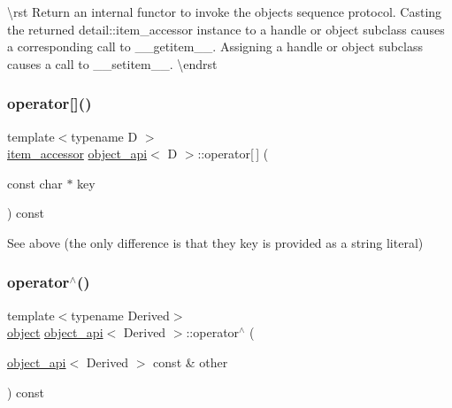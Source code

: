 \textbackslash{}rst Return an internal functor to invoke the object\textquotesingle{}s sequence protocol. Casting the returned {\ttfamily detail\+::item\+\_\+accessor} instance to a {\ttfamily handle} or {\ttfamily object} subclass causes a corresponding call to {\ttfamily \+\_\+\+\_\+getitem\+\_\+\+\_\+}. Assigning a {\ttfamily handle} or {\ttfamily object} subclass causes a call to {\ttfamily \+\_\+\+\_\+setitem\+\_\+\+\_\+}. \textbackslash{}endrst \mbox{\label{classobject__api_a81277a47b87a2a79f216895d7a5018a8}} 
\subsubsection{\texorpdfstring{operator[]()}{operator[]()}\hspace{0.1cm}{\footnotesize\ttfamily [2/2]}}
{\footnotesize\ttfamily template$<$typename D $>$ \\
\mbox{\hyperlink{pytypes_8h_a9907d3edf962653e33d36bccc8b8a268}{item\+\_\+accessor}} \mbox{\hyperlink{classobject__api}{object\+\_\+api}}$<$ D $>$\+::operator\mbox{[}$\,$\mbox{]} (\begin{DoxyParamCaption}\item[{const char $\ast$}]{key }\end{DoxyParamCaption}) const}



See above (the only difference is that they key is provided as a string literal) 

\mbox{\label{classobject__api_acc1fc225681c932e6f3579bf43ef1e47}} 
\subsubsection{\texorpdfstring{operator$^\wedge$()}{operator^()}}
{\footnotesize\ttfamily template$<$typename Derived$>$ \\
\mbox{\hyperlink{classobject}{object}} \mbox{\hyperlink{classobject__api}{object\+\_\+api}}$<$ Derived $>$\+::operator$^\wedge$ (\begin{DoxyParamCaption}\item[{\mbox{\hyperlink{classobject__api}{object\+\_\+api}}$<$ Derived $>$ const \&}]{other }\end{DoxyParamCaption}) const}

